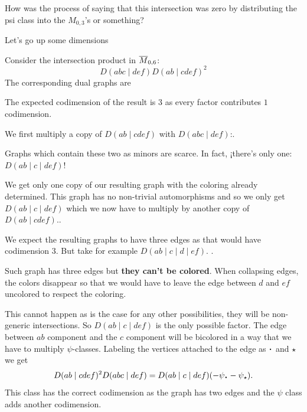 \documentclass[12pt]{memoir}
\begin{document}
\begin{ptcb}
    \begin{Qn}
        How was the process of saying that this intersection was zero by distributing the psi class into the $M_{0,3}$'s or something?
    \end{Qn}    
\end{ptcb}

Let's go up some dimensions

\begin{Ex}
    Consider the intersection product in $\overline{M}_{0,6}$:
    $$D(abc\mid def) D(ab\mid cdef)^2 $$
    The corresponding dual graphs are \par
    The expected codimension of the result is $3$ as every factor contributes $1$ codimension.\par

    We first multiply a copy of $D(ab\mid cdef)$ with $D(abc\mid def)$:.\par

    Graphs which contain these two as minors are scarce. In fact, ¡there's only one: $D(ab\mid c\mid def)$!\par 

    We get only one copy of our resulting graph with the coloring already determined.
    This graph has no non-trivial automorphisms and so we only get $D(ab\mid c\mid def)$ which we now have to multiply by another copy of $D(ab\mid cdef)$..\par

    We expect the resulting graphs to have three edges as that would have codimension $3$. But take for example $D(ab\mid c\mid d\mid ef)$. .\par
    
    Such graph has three edges but \textbf{they can't be colored}. When collapsing edges, the colors disappear so that we would have to leave the edge between $d$ and $ef$ uncolored to respect the coloring.\par
    This cannot happen as is the case for any other possibilities, they will be non-generic intersections. So $D(ab\mid c\mid def)$ is the only possible factor. The edge between $ab$ component and the $c$ component will be bicolored in a way that we have to multiply $\psi$-classes. Labeling the vertices attached to the edge as $\.$ and $\star$ we get 
    $$D(ab\mid cdef)^2 D(abc\mid def)=D(ab\mid c\mid def)(-\psi_\.-\psi_\star).$$
    This class has the correct codimension as the graph has two edges and the $\psi$ class adds another codimension.
\end{Ex}
\end{document}
